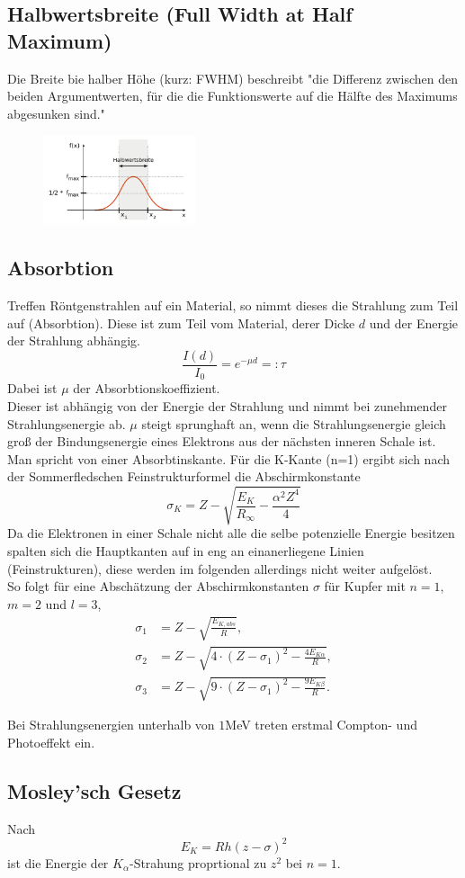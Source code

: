 \subsection{Halbwertsbreite (Full Width at Half Maximum)}
Die Breite bie halber Höhe (kurz: FWHM) beschreibt "die Differenz zwischen 
den beiden Argumentwerten, für die die Funktionswerte auf die 
Hälfte des Maximums abgesunken sind."\cite{wiki2}
\begin{figure}
    \centering
    \includegraphics[width=0.4\textwidth]{plots/Halbwertsbreite.png}
    \caption{}
\end{figure}
\subsection{Absorbtion}
Treffen Röntgenstrahlen auf ein Material, so nimmt dieses die Strahlung zum Teil
auf (Absorbtion). Diese ist zum Teil vom Material, derer Dicke $d$ und der Energie 
der Strahlung abhängig.
\begin{equation}
    \frac{I(d)}{I_0}=e^{-\mu d}=:\tau
\end{equation}
Dabei ist $\mu$ der Absorbtionskoeffizient.\\
Dieser ist abhängig von der Energie der Strahlung und nimmt bei zunehmender
Strahlungsenergie ab. $\mu$ steigt sprunghaft an, wenn die Strahlungsenergie
gleich groß der Bindungsenergie eines Elektrons aus der nächsten inneren Schale ist.
Man spricht von einer Absorbtinskante.
Für die K-Kante (n=1) ergibt sich nach der Sommerfledschen Feinstrukturformel
die Abschirmkonstante
\begin{equation}
    \sigma_K=Z-\sqrt{\frac{E_K}{R_{\infty}}-\frac{\alpha^2Z^4}{4}}
    \label{eqn:sigmaZ}
\end{equation}
Da die Elektronen in einer Schale nicht alle die selbe potenzielle Energie
besitzen spalten sich die Hauptkanten auf in eng an einanerliegene Linien (Feinstrukturen),
diese werden im folgenden allerdings nicht weiter aufgelöst.\\
So folgt für eine Abschätzung der Abschirmkonstanten $\sigma$ für Kupfer
mit $n=1$,$m=2$ und $l=3$,
\begin{align}
    \sigma_1 &= Z-\sqrt{\frac{E_{K,abs}}{R}},\\
    \sigma_2 &= Z-\sqrt{4\cdot (Z-\sigma_1)^2-\frac{4E_{K\alpha}}{R}}, \\
    \sigma_3 &= Z-\sqrt{9\cdot(Z-\sigma_1)^2-\frac{9E_{K\beta}}{R}} .
    \label{eqn:sigma}
\end{align}

Bei Strahlungsenergien unterhalb von $1$MeV treten erstmal Compton- und Photoeffekt ein.
\subsection{Mosley'sch Gesetz}
Nach 
\begin{equation}
    E_K=Rh(z-\sigma)^2
    \label{eqn:mos}
\end{equation}
ist die Energie der $K_{\alpha}$-Strahung proprtional zu $z^2$ bei $n=1$.




